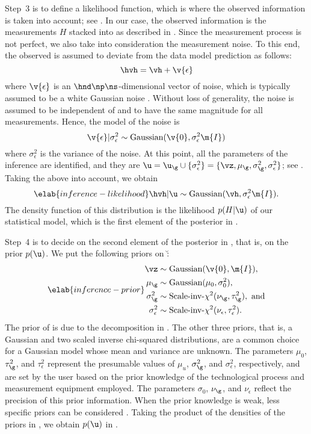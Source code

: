Step~3 is to define a likelihood function, which is where the observed
information is taken into account; see . In our case,
the observed information is the measurements $H$ stacked into \hvh as described
in . Since the measurement process is not perfect, we
also take into consideration the measurement noise. To this end, the observed
\hvh is assumed to deviate from the data model prediction \vh as follows:
\[
  \hvh = \vh + \v{\epsilon}
\]
where $\v{\epsilon}$ is an $\hnd \np \ns$-dimensional vector of noise, which is
typically assumed to be a white Gaussian noise \cite{rasmussen2006,
marzouk2009}. Without loss of generality, the noise is assumed to be independent
of \g and to have the same magnitude for all measurements. Hence, the model of
the noise is
\[
  \v{\epsilon} | \sigma^2_\epsilon \sim \text{Gaussian}(\v{0}, \sigma^2_\epsilon \m{I})
\]
where $\sigma^2_\epsilon$ is the variance of the noise. At this point, all the
parameters of the inference are identified, and they are $\u = \u_\g \cup \{
\sigma_\epsilon^2 \} = \{ \vz, \mu_\g, \sigma_\g^2, \sigma_\epsilon^2 \}$; see
. Taking the above into account, we obtain
\begin{equation} \elab{inference-likelihood}
  \hvh | \u \sim \text{Gaussian}(\vh, \sigma_\epsilon^2 \m{I}).
\end{equation}
The density function of this distribution is the likelihood $p(H | \u)$ of our
statistical model, which is the first element of the posterior in
.

Step~4 is to decide on the second element of the posterior in
, that is, on the prior $p(\u)$. We put the following priors
on \u:
\begin{align} \elab{inference-prior}
  \begin{split}
    \vz               & \sim \text{Gaussian}(\v{0}, \m{I}), \\
    \mu_\g            & \sim \text{Gaussian}(\mu_0, \sigma^2_0), \\
    \sigma^2_\g       & \sim \text{Scale-inv-$\chi^2$}(\nu_\g, \tau^2_\g), \text{ and} \\
    \sigma^2_\epsilon & \sim \text{Scale-inv-$\chi^2$}(\nu_\epsilon, \tau^2_\epsilon).
  \end{split}
\end{align}
The prior of \vz is due to the decomposition in . The
other three priors, that is, a Gaussian and two scaled inverse chi-squared
distributions, are a common choice for a Gaussian model whose mean and variance
are unknown. The parameters $\mu_0$, $\tau^2_\g$, and $\tau^2_\epsilon$
represent the presumable values of $\mu_u$, $\sigma^2_\g$, and
$\sigma^2_\epsilon$, respectively, and are set by the user based on the prior
knowledge of the technological process and measurement equipment employed. The
parameters $\sigma_0$, $\nu_\g$, and $\nu_\epsilon$ reflect the precision of
this prior information. When the prior knowledge is weak, less specific priors
can be considered \cite{gelman2004}. Taking the product of the densities of the
priors in , we obtain $p(\u)$ in .

